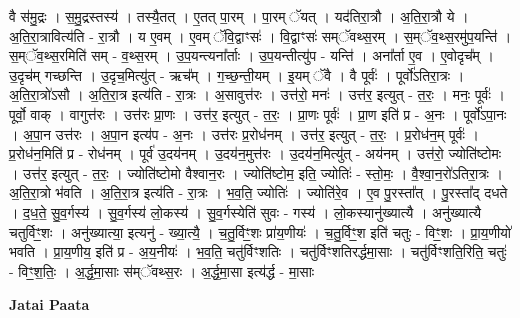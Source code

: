 \documentclass[17pt]{extarticle}
\begin{document}
वै स॑मु॒द्रः । स॒मु॒द्रस्तस्य॑ । तस्यै॒तत् । ए॒तत् पा॒रम् । पा॒रम् ॅयत् । यद॑तिरा॒त्रौ । अ॒ति॒रा॒त्रौ ये । अ॒ति॒रा॒त्रावित्य॑ति - रा॒त्रौ । य ए॒वम् । ए॒वम् ॅवि॒द्वाꣳसः॑ । वि॒द्वाꣳसः॑ सम्ॅवथ्स॒रम् । स॒म्ॅव॒थ्स॒रमु॑प॒यन्ति॑ । स॒म्ॅव॒थ्स॒रमिति॑ सम् - व॒थ्स॒रम् । उ॒प॒यन्त्यना᳚र्ताः । उ॒प॒यन्तीत्यु॑प - यन्ति॑ । अना᳚र्ता ए॒व । ए॒वोदृच᳚म् । उ॒दृच॑म् गच्छन्ति । उ॒दृच॒मित्यु॑त् - ऋच᳚म् । ग॒च्छ॒न्ती॒यम् । इ॒यम् ॅवै । वै पूर्वः॑ । पूर्वो॑ऽतिरा॒त्रः । अ॒ति॒रा॒त्रो॑ऽसौ । अ॒ति॒रा॒त्र इत्य॑ति - रा॒त्रः । अ॒सावुत्त॑रः । उत्त॑रो॒ मनः॑ । उत्त॑र॒ इत्युत् - त॒रः॒ । मनः॒ पूर्वः॑ । पूर्वो॒ वाक् । वागुत्त॑रः । उत्त॑रः प्रा॒णः । उत्त॑र॒ इत्युत् - त॒रः॒ । प्रा॒णः पूर्वः॑ । प्रा॒ण इति॑ प्र - अ॒नः । पूर्वो॑ऽपा॒नः । अ॒पा॒न उत्त॑रः । अ॒पा॒न इत्य॑प - अ॒नः । उत्त॑रः प्र॒रोध॑नम् । उत्त॑र॒ इत्युत् - त॒रः॒ । प्र॒रोध॑न॒म् पूर्वः॑ । प्र॒रोध॑न॒मिति॑ प्र - रोध॑नम् । पूर्व॑ उ॒दय॑नम् । उ॒दय॑न॒मुत्त॑रः । उ॒दय॑न॒मित्यु॑त् - अय॑नम् । उत्त॑रो॒ ज्योति॑ष्टोमः । उत्त॑र॒ इत्युत् - त॒रः॒ । ज्योति॑ष्टोमो वैश्वान॒रः । ज्योति॑ष्टोम॒ इति॒ ज्योतिः॑ - स्तो॒मः॒ । वै॒श्वा॒न॒रो॑ऽतिरा॒त्रः । अ॒ति॒रा॒त्रो भ॑वति । अ॒ति॒रा॒त्र इत्य॑ति - रा॒त्रः । भ॒व॒ति॒ ज्योतिः॑ । ज्योति॑रे॒व । ए॒व पु॒रस्ता᳚त् । पु॒रस्ता᳚द् दधते । द॒ध॒ते॒ सु॒व॒र्गस्य॑ । सु॒व॒र्गस्य॑ लो॒कस्य॑ । सु॒व॒र्गस्येति॑ सुवः - गस्य॑ । लो॒कस्यानु॑ख्यात्यै । अनु॑ख्यात्यै चतुर्विꣳ॒॒शः । अनु॑ख्यात्या॒ इत्यनु॑ - ख्या॒त्यै॒ । च॒तु॒र्विꣳ॒॒शः प्रा॑य॒णीयः॑ । च॒तु॒र्विꣳ॒॒श इति॑ चतुः - विꣳ॒॒शः । प्रा॒य॒णीयो॑ भवति । प्रा॒य॒णीय॒ इति॑ प्र - अ॒य॒नीयः॑ । भ॒व॒ति॒ चतु॑र्विꣳशतिः । चतु॑र्विꣳशतिरर्द्धमा॒साः । चतु॑र्विꣳशति॒रिति॒ चतुः॑ - विꣳ॒॒श॒तिः॒ । अ॒र्द्ध॒मा॒साः स॑म्ॅवथ्स॒रः । अ॒र्द्ध॒मा॒सा इत्य॑र्द्ध - मा॒साः \newline

\textbf{Jatai Paata} \newline
\end{document}
